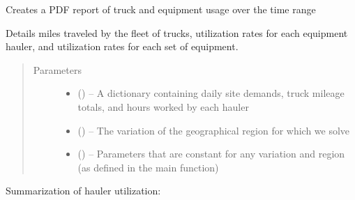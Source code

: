 \documentclass[letterpaper,10pt,english]{sphinxmanual}
\begin{document}
\begin{fulllineitems}
\label{\detokenize{reporting:reporting.make_report}}
Creates a PDF report of truck and equipment usage over the time range

Details miles traveled by the fleet of trucks, utilization rates for each
equipment hauler, and utilization rates for each set of equipment.
\begin{quote}\begin{description}
\item[{Parameters}] \leavevmode\begin{itemize}
\item {} 
 () -- A dictionary containing daily site demands, truck mileage totals, and
hours worked by each hauler

\item {} 
 () -- The variation of the geographical region for which we solve

\item {} 
 () -- Parameters that are constant for any variation and region (as defined
in the main function)

\end{itemize}

\end{description}\end{quote}

\end{fulllineitems}


Summarization of hauler utilization:
\end{document}
